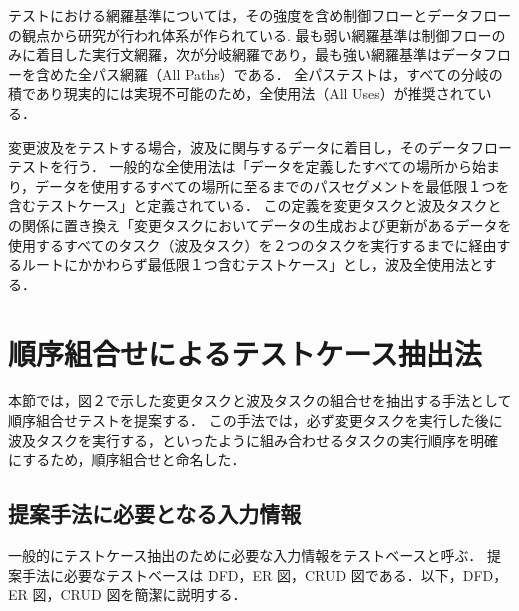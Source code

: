 \documentclass[a4paper,11pt]{jreport}
\begin{document}
テストにおける網羅基準については，その強度を含め制御フローとデータフローの観点から研究が行われ体系が作られている\cite{beiz90}.
最も弱い網羅基準は制御フローのみに着目した実行文網羅，次が分岐網羅であり，最も強い網羅基準はデータフローを含めた全パス網羅（All Paths）である．%
全パステストは，すべての分岐の積であり現実的には実現不可能のため，全使用法（All Uses）が推奨されている\cite{beiz90}．

変更波及をテストする場合，波及に関与するデータに着目し，そのデータフローテストを行う．
一般的な全使用法は「データを定義したすべての場所から始まり，データを使用するすべての場所に至るまでのパスセグメントを最低限１つを含むテストケース」と定義されている\cite{beiz90}．
この定義を変更タスクと波及タスクとの関係に置き換え「変更タスクにおいてデータの生成および更新があるデータを使用するすべてのタスク（波及タスク）を２つのタスクを実行するまでに経由するルートにかかわらず最低限１つ含むテストケース」とし，波及全使用法とする．


\section{順序組合せによるテストケース抽出法}

本節では，図２で示した変更タスクと波及タスクの組合せを抽出する手法として順序組合せテストを提案する．
この手法では，必ず変更タスクを実行した後に波及タスクを実行する，といったように組み合わせるタスクの実行順序を明確にするため，順序組合せと命名した．
\subsection{提案手法に必要となる入力情報}
 一般的にテストケース抽出のために必要な入力情報をテストベースと呼ぶ\cite{Demarco}．
提案手法に必要なテストベースは DFD，ER 図，CRUD 図である．以下，DFD，ER 図，CRUD 図を簡潔に説明する．
\end{document}
